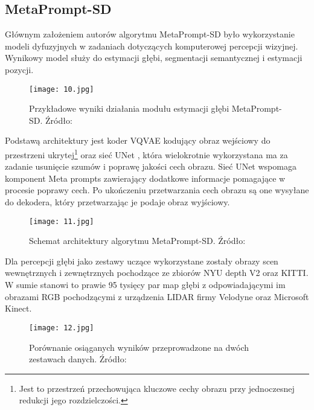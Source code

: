 \subsection{MetaPrompt-SD}
Głównym założeniem autorów algorytmu MetaPrompt-SD \cite{wan2023} było wykorzystanie modeli dyfuzyjnych w zadaniach dotyczących komputerowej percepcji wizyjnej. Wynikowy model służy do estymacji głębi, segmentacji semantycznej i estymacji pozycji.
\begin{figure}[H]
    \centering
    \texttt{[image: 10.jpg]}
    \caption{Przykładowe wyniki działania modułu estymacji głębi MetaPrompt-SD. Źródło: \cite{wan2023}}
    \label{fig:metaprompt-sd}
\end{figure}
Podstawą architektury jest koder VQVAE \cite{oord2018} kodujący obraz wejściowy do przestrzeni ukrytej\footnote{Jest to przestrzeń przechowująca kluczowe cechy obrazu przy jednoczesnej redukcji jego rozdzielczości.} oraz sieć UNet \cite{ronneberger2015}, która wielokrotnie wykorzystana ma za zadanie usunięcie szumów i poprawę jakości cech obrazu. Sieć UNet wspomaga komponent Meta prompts zawierający dodatkowe informacje pomagające w procesie poprawy cech. Po ukończeniu przetwarzania cech obrazu są one wysyłane do dekodera, który przetwarzając je podaje obraz wyjściowy.
\begin{figure}[H]
    \centering
    \texttt{[image: 11.jpg]}
    \caption{Schemat architektury algorytmu MetaPrompt-SD. Źródło: \cite{wan2023}}
    \label{fig:metaprompt-sd-schema}
\end{figure}
Dla percepcji głębi jako zestawy uczące wykorzystane zostały obrazy scen wewnętrznych i zewnętrznych pochodzące ze zbiorów NYU depth V2 oraz KITTI. W sumie stanowi to prawie 95 tysięcy par map głębi z odpowiadającymi im obrazami RGB pochodzącymi z urządzenia LIDAR firmy Velodyne oraz Microsoft Kinect.
\begin{figure}[H]
    \centering
    \texttt{[image: 12.jpg]}
    \caption{Porównanie osiąganych wyników przeprowadzone na dwóch zestawach danych. Źródło: \cite{wan2023}}
    \label{fig:metaprompt-sd-results}
\end{figure}

